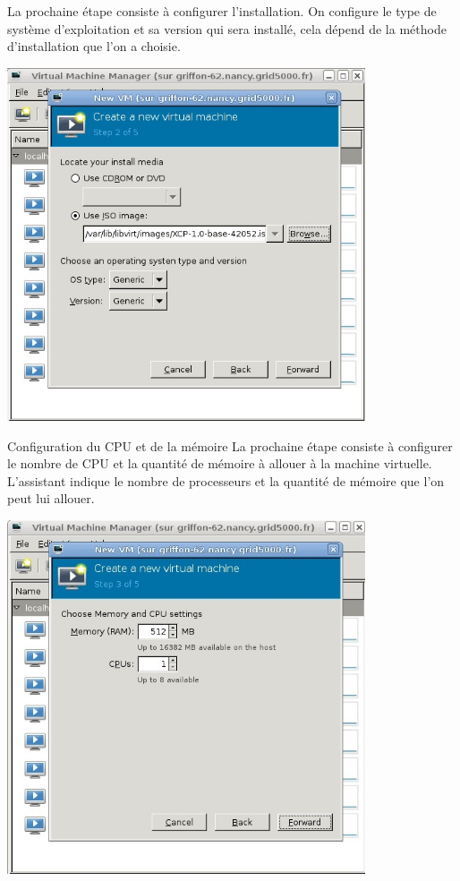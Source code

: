 La prochaine étape consiste à configurer l'installation.
On configure le type de système d'exploitation et sa version qui sera installé, cela dépend de la méthode d'installation que l'on a choisie.
\begin{center}
\includegraphics[width=300pt]{images/iso.jpg}
\end{center}

Configuration du CPU et de la mémoire
La prochaine étape consiste à configurer le nombre de CPU et la quantité de mémoire à allouer à la machine virtuelle. L'assistant indique le nombre de processeurs et la quantité de mémoire que l'on peut lui allouer.
\begin{center}
\includegraphics[width=300pt]{images/cpu.jpg}
\end{center}

